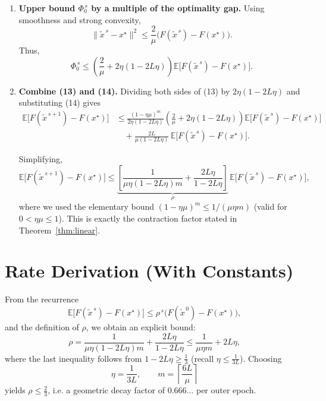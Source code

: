\documentclass{article}
\begin{document}
\begin{enumerate}[label=[Step \arabic*], leftmargin=*]
\item \textbf{Upper bound $\Phi_{0}^{\,s}$ by a multiple of the optimality gap.}  
Using smoothness and strong convexity,
\[
\|\tilde{x}^{\,s}-x^\star\|^{2}
\le \frac{2}{\mu}\bigl(F(\tilde{x}^{\,s})-F(x^\star)\bigr).
\]
Thus,
\[
\Phi_{0}^{\,s}
\le \left(\frac{2}{\mu}+2\eta(1-2L\eta)\right)
\mathbb{E}\!\bigl[F(\tilde{x}^{\,s})-F(x^\star)\bigr]. \tag{14}
\]

\item \textbf{Combine (13) and (14).}  
Dividing both sides of (13) by $2\eta(1-2L\eta)$ and substituting (14) gives
\[
\begin{aligned}
\mathbb{E}\!\bigl[F(\tilde{x}^{\,s+1})-F(x^\star)\bigr]
&\le \frac{(1-\eta\mu)^{m}}{2\eta(1-2L\eta)}
\left(\frac{2}{\mu}+2\eta(1-2L\eta)\right)
\mathbb{E}\!\bigl[F(\tilde{x}^{\,s})-F(x^\star)\bigr] \\
&\quad +\frac{2L}{\mu(1-2L\eta)}\,
\mathbb{E}\!\bigl[F(\tilde{x}^{\,s})-F(x^\star)\bigr].
\end{aligned}
\]

Simplifying,
\[
\mathbb{E}\!\bigl[F(\tilde{x}^{\,s+1})-F(x^\star)\bigr]
\le \underbrace{\left[\frac{1}{\mu\eta(1-2L\eta)m}
      +\frac{2L\eta}{1-2L\eta}\right]}_{\displaystyle\rho}
      \,\mathbb{E}\!\bigl[F(\tilde{x}^{\,s})-F(x^\star)\bigr],
\]
where we used the elementary bound $(1-\eta\mu)^{m}\le 1/(\mu\eta m)$ (valid for $0<\eta\mu\le1$). This is exactly the contraction factor stated in Theorem~\ref{thm:linear}. \qedhere
\end{enumerate}

\section*{Rate Derivation (With Constants)}
From the recurrence
\[
\mathbb{E}\!\bigl[F(\tilde{x}^{\,s})-F(x^\star)\bigr]\le\rho^{\,s}\bigl(F(\tilde{x}^{\,0})-F(x^\star)\bigr),
\]
and the definition of $\rho$, we obtain an explicit bound:
\[
\rho
= \frac{1}{\mu\eta(1-2L\eta)m}+ \frac{2L\eta}{1-2L\eta}
\le \frac{1}{\mu\eta m}+2L\eta,
\]
where the last inequality follows from $1-2L\eta\ge\frac13$ (recall $\eta\le\frac{1}{3L}$). Choosing
\[
\eta=\frac{1}{3L},\qquad m= \left\lceil\frac{6L}{\mu}\right\rceil
\]
yields $\rho\le\frac{2}{3}$, i.e. a geometric decay factor of $0.666\ldots$ per outer epoch.
\end{document}
